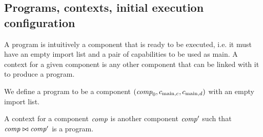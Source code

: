 \documentclass[a4paper]{article}
\begin{document}

\subsection{Programs, contexts, initial execution configuration}
\label{sec:programs}

A program is intuitively a component that is ready to be executed, i.e. it must have an empty import list and a pair of capabilities to be used as main.
A context for a given component is any other component that can be linked with it to produce a program.

\begin{definition}
  We define a program to be a component $(\mathit{comp}_0,c_{\mathrm{main},c}, c_{\mathrm{main},d})$ with an empty import list.

  A context for a component $\mathit{comp}$ is another component $\mathit{comp}'$ such that $\mathit{comp} \bowtie \mathit{comp}'$ is a program.
\end{definition}
\end{document}
